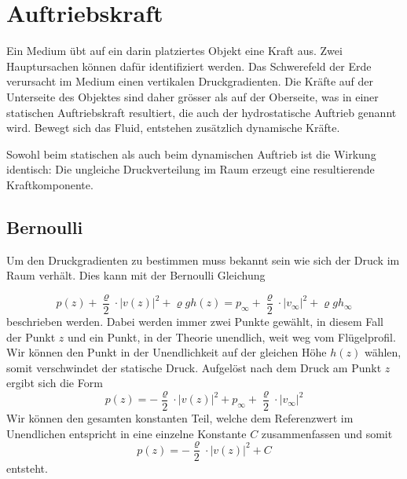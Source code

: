 \section{Auftriebskraft}
	Ein Medium übt auf ein darin platziertes Objekt eine Kraft aus.
	Zwei Hauptursachen können dafür identifiziert werden.
	Das Schwerefeld der Erde verursacht im Medium einen vertikalen Druckgradienten.
	Die Kräfte auf der Unterseite des Objektes sind daher grösser als auf der Oberseite,
	was in einer statischen Auftriebskraft resultiert, die auch der hydrostatische Auftrieb genannt wird. Bewegt sich das Fluid, entstehen zusätzlich dynamische Kräfte. 

	Sowohl beim statischen als auch beim dynamischen Auftrieb ist die Wirkung identisch: Die ungleiche Druckverteilung im Raum erzeugt eine resultierende Kraftkomponente.

\subsection{Bernoulli}
	Um den Druckgradienten zu bestimmen muss bekannt sein wie sich der Druck im Raum verhält. Dies kann mit der Bernoulli Gleichung
	
	\[
		p(z) + \frac{\varrho}{2} \cdot |v(z)|^2 + \varrho g h(z) 
		=
		p_{\infty} + \frac{\varrho}{2} \cdot |v_{\infty}|^2 + \varrho g h_{\infty}
	\]
	beschrieben werden.
	Dabei werden immer zwei Punkte gewählt, in diesem Fall der Punkt $z$ und ein Punkt, in der Theorie unendlich, weit weg vom Flügelprofil. Wir können den Punkt in der Unendlichkeit auf der gleichen Höhe $h(z)$ wählen, somit verschwindet der statische Druck. Aufgelöst nach dem Druck am Punkt $z$ ergibt sich die Form
	\[
		p(z)
		=
		-\frac{\varrho}{2} \cdot |v(z)|^2
		+
		p_{\infty}
		+
		\frac{\varrho}{2} \cdot |v_{\infty}|^2		
	\]
	Wir können den gesamten konstanten Teil,
	welche dem Referenzwert im Unendlichen entspricht in eine einzelne Konstante $C$ zusammenfassen
	und somit
	\[
	p(z)
	= 
	-\frac{\varrho}{2} \cdot |v(z)|^2 + C
	\]
	entsteht.


